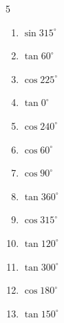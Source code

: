 \begin{multicols}{5}
\begin{enumerate}
  \item $\displaystyle \sin{315^\circ}$


  \item $\displaystyle \tan{60^\circ}$


  \item $\displaystyle \cos{225^\circ}$


  \item $\displaystyle \tan{0^\circ}$

        \phantom{$\displaystyle =0$}

  \item $\displaystyle \cos{240^\circ}$


  \item $\displaystyle \cos{60^\circ}$


  \item $\displaystyle \cos{90^\circ}$

        \phantom{$\displaystyle =0$}

  \item $\displaystyle \tan{360^\circ}$

        \phantom{$\displaystyle =0$}

  \item $\displaystyle \cos{315^\circ}$


  \item $\displaystyle \tan{120^\circ}$


  \item $\displaystyle \tan{300^\circ}$


  \item $\displaystyle \cos{180^\circ}$

        \phantom{$\displaystyle =-1$}

  \item $\displaystyle \tan{150^\circ}$


\end{enumerate}
\end{multicols}
